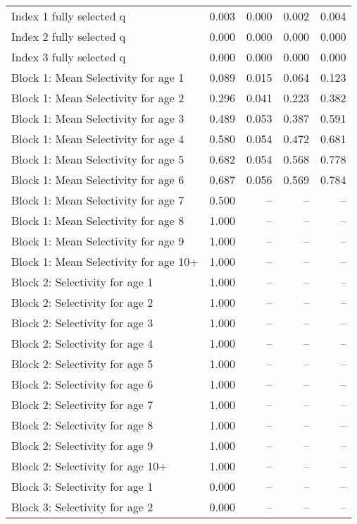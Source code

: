 \documentclass[
]{article}
\begin{document}
\begin{landscape}
\begin{longtable}[t]{lrrrr}
\endfoot
\bottomrule
\endlastfoot
Index 1 fully selected q & 0.003 & 0.000 & 0.002 & 0.004\\
Index 2 fully selected q & 0.000 & 0.000 & 0.000 & 0.000\\
Index 3 fully selected q & 0.000 & 0.000 & 0.000 & 0.000\\
Block 1: Mean Selectivity for age 1 & 0.089 & 0.015 & 0.064 & 0.123\\
Block 1: Mean Selectivity for age 2 & 0.296 & 0.041 & 0.223 & 0.382\\
\addlinespace
Block 1: Mean Selectivity for age 3 & 0.489 & 0.053 & 0.387 & 0.591\\
Block 1: Mean Selectivity for age 4 & 0.580 & 0.054 & 0.472 & 0.681\\
Block 1: Mean Selectivity for age 5 & 0.682 & 0.054 & 0.568 & 0.778\\
Block 1: Mean Selectivity for age 6 & 0.687 & 0.056 & 0.569 & 0.784\\
Block 1: Mean Selectivity for age 7 & 0.500 & -- & -- & --\\
\addlinespace
Block 1: Mean Selectivity for age 8 & 1.000 & -- & -- & --\\
Block 1: Mean Selectivity for age 9 & 1.000 & -- & -- & --\\
Block 1: Mean Selectivity for age 10+ & 1.000 & -- & -- & --\\
Block 2: Selectivity for age 1 & 1.000 & -- & -- & --\\
Block 2: Selectivity for age 2 & 1.000 & -- & -- & --\\
\addlinespace
Block 2: Selectivity for age 3 & 1.000 & -- & -- & --\\
Block 2: Selectivity for age 4 & 1.000 & -- & -- & --\\
Block 2: Selectivity for age 5 & 1.000 & -- & -- & --\\
Block 2: Selectivity for age 6 & 1.000 & -- & -- & --\\
Block 2: Selectivity for age 7 & 1.000 & -- & -- & --\\
\addlinespace
Block 2: Selectivity for age 8 & 1.000 & -- & -- & --\\
Block 2: Selectivity for age 9 & 1.000 & -- & -- & --\\
Block 2: Selectivity for age 10+ & 1.000 & -- & -- & --\\
Block 3: Selectivity for age 1 & 0.000 & -- & -- & --\\
Block 3: Selectivity for age 2 & 0.000 & -- & -- & --\\

\end{longtable}
\end{landscape}
\end{document}
